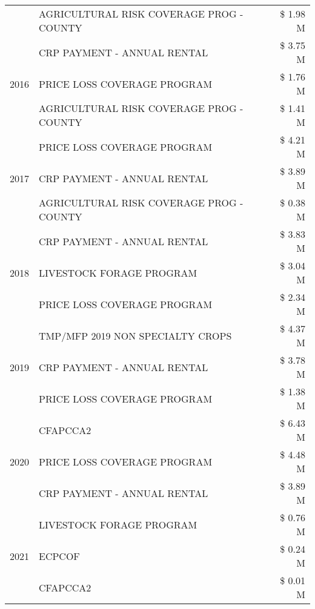 \begin{tabular}{llr}
 & AGRICULTURAL RISK COVERAGE PROG - COUNTY & \$ 1.98 M \\
\cline{1-3}
\multirow[t]{3}{*}{2016} & CRP PAYMENT - ANNUAL RENTAL & \$ 3.75 M \\
 & PRICE LOSS COVERAGE PROGRAM & \$ 1.76 M \\
 & AGRICULTURAL RISK COVERAGE PROG - COUNTY & \$ 1.41 M \\
\cline{1-3}
\multirow[t]{3}{*}{2017} & PRICE LOSS COVERAGE PROGRAM & \$ 4.21 M \\
 & CRP PAYMENT - ANNUAL RENTAL & \$ 3.89 M \\
 & AGRICULTURAL RISK COVERAGE PROG - COUNTY & \$ 0.38 M \\
\cline{1-3}
\multirow[t]{3}{*}{2018} & CRP PAYMENT - ANNUAL RENTAL & \$ 3.83 M \\
 & LIVESTOCK FORAGE PROGRAM & \$ 3.04 M \\
 & PRICE LOSS COVERAGE PROGRAM & \$ 2.34 M \\
\cline{1-3}
\multirow[t]{3}{*}{2019} & TMP/MFP 2019 NON SPECIALTY CROPS & \$ 4.37 M \\
 & CRP PAYMENT - ANNUAL RENTAL & \$ 3.78 M \\
 & PRICE LOSS COVERAGE PROGRAM & \$ 1.38 M \\
\cline{1-3}
\multirow[t]{3}{*}{2020} & CFAPCCA2 & \$ 6.43 M \\
 & PRICE LOSS COVERAGE PROGRAM & \$ 4.48 M \\
 & CRP PAYMENT - ANNUAL RENTAL & \$ 3.89 M \\
\cline{1-3}
\multirow[t]{3}{*}{2021} & LIVESTOCK FORAGE PROGRAM & \$ 0.76 M \\
 & ECPCOF & \$ 0.24 M \\
 & CFAPCCA2 & \$ 0.01 M \\
\cline{1-3}
\bottomrule
\end{tabular}
